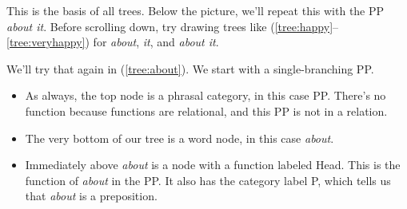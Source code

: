\ea {}\label{tree:veryhappy}
\z

This is the basis of all trees. Below the picture, we'll repeat this with the PP \textit{about it}. Before scrolling down, try drawing trees like (\ref{tree:happy}--\ref{tree:veryhappy}) for \textit{about}, \textit{it}, and \textit{about it}.

We'll try that again in (\ref{tree:about}). We start with a single-branching PP.
\begin{itemize}[noitemsep]
    \item As always, the top node is a phrasal category, in this case PP. There's no function because functions are relational, and this PP is not in a relation.
    \item The very bottom of our tree is a word node, in this case \textit{about}.
    \item Immediately above \textit{about} is a node with a function labeled Head. This is the function of \textit{about} in the PP. It also has the category label P, which tells us that \textit{about} is a preposition.
\end{itemize}

\ea {}\label{tree:about}
\z

